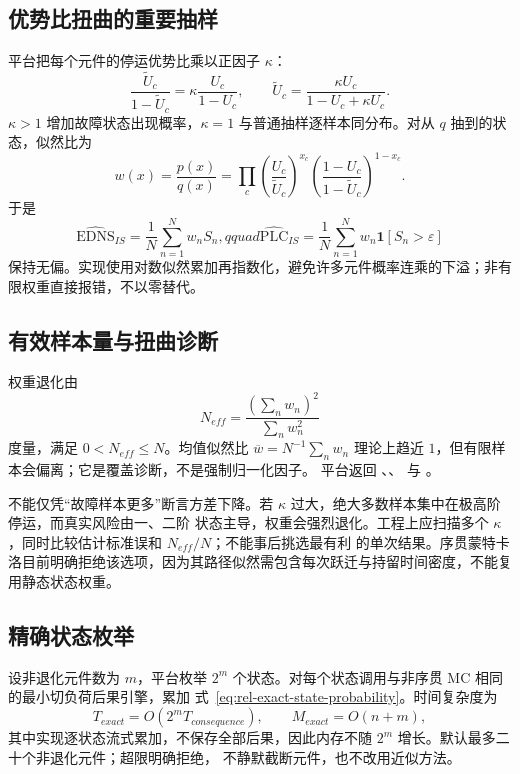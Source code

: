 \subsection{优势比扭曲的重要抽样}
平台把每个元件的停运优势比乘以正因子 $\kappa$：
\begin{equation}
 \frac{\widetilde U_c}{1-\widetilde U_c}
 =\kappa\frac{U_c}{1-U_c},\qquad
 \widetilde U_c=\frac{\kappa U_c}{1-U_c+\kappa U_c}.
 \label{eq:rel-is-twist}
\end{equation}
$\kappa>1$ 增加故障状态出现概率，$\kappa=1$ 与普通抽样逐样本同分布。对从 $q$ 抽到的状态，似然比为
\begin{equation}
 w(x)=\frac{p(x)}{q(x)}
 =\prod_c\left(\frac{U_c}{\widetilde U_c}\right)^{x_c}
 \left(\frac{1-U_c}{1-\widetilde U_c}\right)^{1-x_c}.
\end{equation}
于是
\begin{equation}
 \widehat{\mathrm{EDNS}}_{IS}=\frac1N\sum_{n=1}^Nw_nS_n,qquad
 \widehat{\mathrm{PLC}}_{IS}=\frac1N\sum_{n=1}^Nw_n\mathbf 1[S_n>\varepsilon]
\end{equation}
保持无偏。实现使用对数似然累加再指数化，避免许多元件概率连乘的下溢；非有限权重直接报错，不以零替代。

\subsection{有效样本量与扭曲诊断}
权重退化由
\begin{equation}
 N_{eff}=\frac{(\sum_nw_n)^2}{\sum_nw_n^2}
\end{equation}
度量，满足 $0<N_{eff}\le N$。均值似然比
$\overline w=N^{-1}\sum_nw_n$ 理论上趋近 $1$，但有限样本会偏离；它是覆盖诊断，不是强制归一化因子。
平台返回 、、
 与 。

不能仅凭“故障样本更多”断言方差下降。若 $\kappa$ 过大，绝大多数样本集中在极高阶停运，而真实风险由一、二阶
状态主导，权重会强烈退化。工程上应扫描多个 $\kappa$，同时比较估计标准误和 $N_{eff}/N$；不能事后挑选最有利
的单次结果。序贯蒙特卡洛目前明确拒绝该选项，因为其路径似然需包含每次跃迁与持留时间密度，不能复用静态状态权重。

\subsection{精确状态枚举}
设非退化元件数为 $m$，平台枚举 $2^m$ 个状态。对每个状态调用与非序贯 MC 相同的最小切负荷后果引擎，累加
式~\eqref{eq:rel-exact-state-probability}。时间复杂度为
\begin{equation}
 T_{exact}=O(2^mT_{consequence}),\qquad M_{exact}=O(n+m),
\end{equation}
其中实现逐状态流式累加，不保存全部后果，因此内存不随 $2^m$ 增长。默认最多二十个非退化元件；超限明确拒绝，
不静默截断元件，也不改用近似方法。

